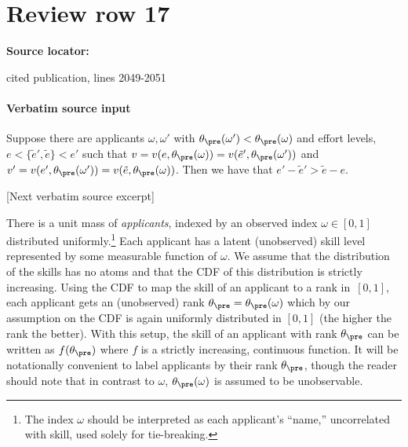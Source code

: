 \documentclass[10pt]{article}
\begin{document}
\section*{Review row 17}
\textbf{Source locator:} {\footnotesize\raggedright cited publication, lines 2049-\allowbreak{}2051\par}
\paragraph{Verbatim source input}
\begin{ReviewVerbatim}
\begin{lemma}\label{lem:order_g}
Suppose there are applicants $\omega, \omega'$ with $\theta_\pre(\omega') <\theta_\pre(\omega) $ and effort levels, $e<\{\tilde e', \tilde e \}<e'$ such that $v = v(e, \theta_\pre(\omega)) =v(\tilde{e}', \theta_\pre(\omega'))  $ and $v' =v(e', \theta_\pre(\omega'))=v(\tilde e, \theta_\pre(\omega))$. Then we have that $ e' - \tilde e' > \tilde e - e$.
\end{lemma}

[Next verbatim source excerpt]

There is a unit mass of \textit{applicants}, indexed by an observed index $\omega \in [0,1]$ distributed uniformly.\footnote{The index $\omega$ should be interpreted as each applicant's ``name,'' uncorrelated with skill, used solely for tie-breaking.}  Each applicant has a latent (unobserved) skill level represented by some measurable function of $\omega$.
We assume that {the distribution of the skills} has no atoms and that the CDF of this distribution is strictly increasing.
Using the CDF to map the skill of an applicant to a rank in~$[0,1]$, each applicant gets an (unobserved) rank $\theta_\pre =\theta_\pre(\omega)$ which by our assumption on the CDF is again uniformly distributed in $[0, 1]$ (the higher the rank the better).  With this setup, the skill of an applicant with rank $\theta_\pre$ can be written as $f(\theta_\pre)$ where $f$ is a strictly increasing, continuous function.  {It will be notationally convenient to label applicants by their rank $\theta_\pre$, though the reader should note that in contrast to $\omega$, $\theta_\pre(\omega)$ is assumed to be unobservable.}




\end{ReviewVerbatim}
\end{document}
